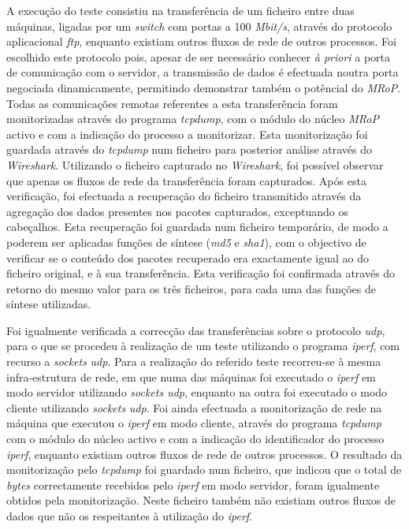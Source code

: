 A execução do teste consistiu na transferência de um ficheiro entre duas máquinas, ligadas por um \textit{switch} com portas a 100 \textit{Mbit/s}, através do protocolo aplicacional \textit{ftp}, enquanto existiam outros fluxos de rede de outros processos.
Foi escolhido este protocolo pois, apesar de ser necessário conhecer \textit{à priori} a porta de comunicação com o servidor, a transmissão de dados é efectuada noutra porta negociada dinamicamente, permitindo demonstrar também o potêncial do \textit{MRoP}.
Todas as comunicações remotas referentes a esta transferência foram monitorizadas através do programa \textit{tcpdump}, com o módulo do núcleo \textit{MRoP} activo e com a indicação do processo a monitorizar.
Esta monitorização foi guardada através do \textit{tcpdump} num ficheiro para posterior análise através do \textit{Wireshark}.
Utilizando o ficheiro capturado no \textit{Wireshark}, foi possível observar que apenas os fluxos de rede da transferência foram capturados.
Após esta verificação, foi efectuada a recuperação do ficheiro transmitido através da agregação dos dados presentes nos pacotes capturados, exceptuando os cabeçalhos.
Esta recuperação foi guardada num ficheiro temporário, de modo a poderem ser aplicadas funções de síntese (\textit{md5} e \textit{sha1}), com o objectivo de verificar se o conteúdo dos pacotes recuperado era exactamente igual ao do ficheiro original, e à sua transferência.
Esta verificação foi confirmada através do retorno do mesmo valor para os três ficheiros, para cada uma das funções de síntese utilizadas.

Foi igualmente verificada a correcção das transferências sobre o protocolo \textit{udp}, para o que se procedeu à realização de um teste utilizando o programa \textit{iperf}, com recurso a \textit{sockets} \textit{udp}.
Para a realização do referido teste recorreu-se à mesma infra-estrutura de rede, em que numa das máquinas foi executado o \textit{iperf} em modo servidor utilizando \textit{sockets udp}, enquanto na outra foi executado o modo cliente utilizando \textit{sockets} \textit{udp}.
Foi ainda efectuada a monitorização de rede na máquina que executou o \textit{iperf} em modo cliente, através do programa \textit{tcpdump} com o módulo do núcleo activo e com a indicação do identificador do processo \textit{iperf}, enquanto existiam outros fluxos de rede de outros processos.
O resultado da monitorização pelo \textit{tcpdump} foi guardado num ficheiro, que indicou que o total de \textit{bytes} correctamente recebidos pelo \textit{iperf} em modo servidor, foram igualmente obtidos pela monitorização.
Neste ficheiro também não existiam outros fluxos de dados que não os respeitantes à utilização do \textit{iperf}.

